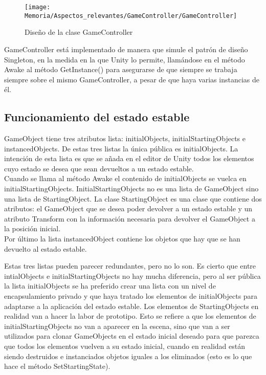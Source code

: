 \begin{figure}[h]
\texttt{[image: Memoria/Aspectos\_relevantes/GameController/GameController]}
\caption{Diseño de la clase GameController}
\end{figure}

GameController está implementado de manera que simule el patrón de diseño Singleton, en la medida en la que Unity lo permite, llamándose en el método Awake al método GetInstance() para asegurarse de que siempre se trabaja siempre sobre el mismo GameController, a pesar de que haya varias instancias de él.

\subsection{Funcionamiento del estado estable}
GameObject tiene tres atributos lista: initialObjects, initialStartingObjects e instancedObjects. De estas tres listas la única pública es initialObjects. La intención de esta lista es que se añada en el editor de Unity todos los elementos cuyo estado se desea que sean devueltos a un estado estable.\\
Cuando se llama al método Awake el contenido de initialObjects se vuelca en initialStartingObjects. InitialStartingObjects no es una lista de GameObject sino una lista de StartingObject. La clase StartingObject es una clase que contiene dos atributos: el GameObject que se desea poder devolver a un estado estable y un atributo Transform con la información necesaria para devolver el GameObject a la posición inicial.\\
Por último la lista instancedObject contiene los objetos que hay que se han devuelto al estado estable.

Estas tres listas pueden parecer redundantes, pero no lo son. Es cierto que entre intialObjects e initialStartingObjects no hay mucha diferencia, pero al ser pública la lista initialObjects se ha preferido crear una lista con un nivel de encapsulamiento privado y que haya tratado los elementos de initialObjects para adaptarse a la aplicación del estado estable. Los elementos de StartingObjects en realidad van a hacer la labor de prototipo. Esto se refiere a que los elementos de initialStartingObjects no van a aparecer en la escena, sino que van a ser utilizados para clonar GameObjects en el estado inicial deseado para que parezca que todos los elementos vuelven a su estado inicial, cuando en realidad están siendo destruidos e instanciados objetos iguales a los eliminados (esto es lo que hace el método SetStartingState).

